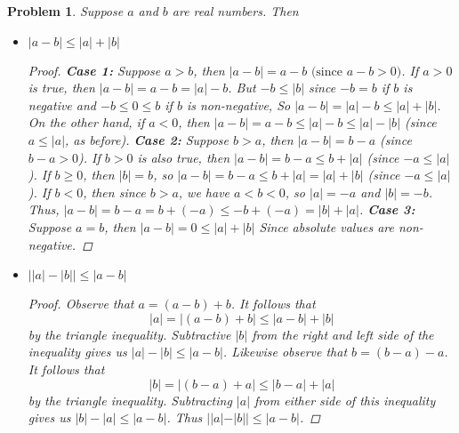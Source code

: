 \documentclass[12pt]{article}
\newtheorem{problem}{Problem}
\begin{document}
\begin{problem} %
Suppose $a$ and $b$ are real numbers.  Then
\begin{itemize}
\item[(a)] $|a-b| \le |a|+|b|$
	\begin{proof}
		\textbf{Case 1:} Suppose $a > b$, then $|a - b| = a - b \text{ (since $a-b > 0$)}$. If $a > 0$ is true, then $|a - b| = a - b = |a| - b$. But $-b \leq |b|$ since $-b = b$ if $b$ is negative and $-b \leq 0 \leq b$ if $b$ is non-negative, So $|a - b| = |a| - b \leq |a| + |b|$. On the other hand, if $a < 0$, then $|a - b| = a - b \leq |a| - b \leq |a| - |b|$ (since $a \leq |a|$, as before). \newline
		\textbf{Case 2:} Suppose $b > a$, then $|a - b| = b - a$ (since $b - a > 0$). If $b > 0$ is also true, then $|a-b| = b- a \leq b + |a|$ (since $-a \leq |a|$). If $b \geq 0$, then $|b| = b$, so $|a-b| = b - a \leq b + |a| = |a| + |b| $ (since $-a \leq |a|$). If $b < 0$, then since $b > a$, we have $a < b < 0$, so $|a| = -a$ and $|b| = -b$. Thus, $|a-b| = b - a = b + (-a) \leq -b + (-a) = |b| + |a|$. \newline
		\textbf{Case 3:} Suppose $a = b$, then $|a - b| = 0 \leq |a| + |b|$ Since absolute values are non-negative.
	\end{proof}
\item[(b)] $\big||a|-|b|\big| \le |a-b|$
	\begin{proof}
		Observe that $a = (a - b) + b$. It follows that
		$$	|a| = |(a - b) + b| \leq |a - b| + |b|$$
		by the triangle inequality. Subtractive $|b|$ from the right and left side of the inequality gives us
		$|a| - |b| \leq |a - b|$. Likewise observe that $b = (b - a) - a$. It follows that
		$$ |b| = |(b-a) + a| \leq |b - a| + |a|$$ by the triangle inequality. Subtracting $|a|$ from either side of this inequality gives us $|b| - |a| \leq |a - b|$. Thus $||a| - |b|| \leq |a - b|$.
	\end{proof}
\end{itemize}
\end{problem}

\end{document}
